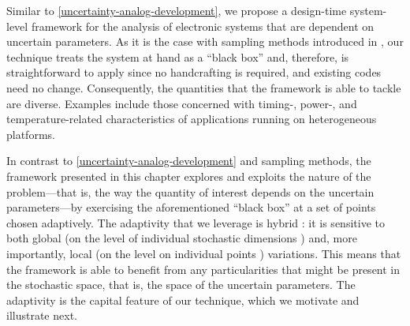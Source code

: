 Similar to \cref{uncertainty-analog-development}, we propose a design-time
system-level framework for the analysis of electronic systems that are dependent
on uncertain parameters. As it is the case with sampling methods introduced in
, our technique treats the system at hand as a ``black box'' and,
therefore, is straightforward to apply since no handcrafting is required, and
existing codes need no change. Consequently, the quantities that the framework
is able to tackle are diverse. Examples include those concerned with timing-,
power-, and temperature-related characteristics of applications running on
heterogeneous platforms.

In contrast to \cref{uncertainty-analog-development} and sampling methods, the
framework presented in this chapter explores and exploits the nature of the
problem---that is, the way the quantity of interest depends on the uncertain
parameters---by exercising the aforementioned ``black box'' at a set of points
chosen adaptively. The adaptivity that we leverage is hybrid \cite{jakeman2012}:
it is sensitive to both global (on the level of individual stochastic dimensions
\cite{klimke2006}) and, more importantly, local (on the level on individual
points \cite{ma2009}) variations. This means that the framework is able to
benefit from any particularities that might be present in the stochastic space,
that is, the space of the uncertain parameters. The adaptivity is the capital
feature of our technique, which we motivate and illustrate next.
